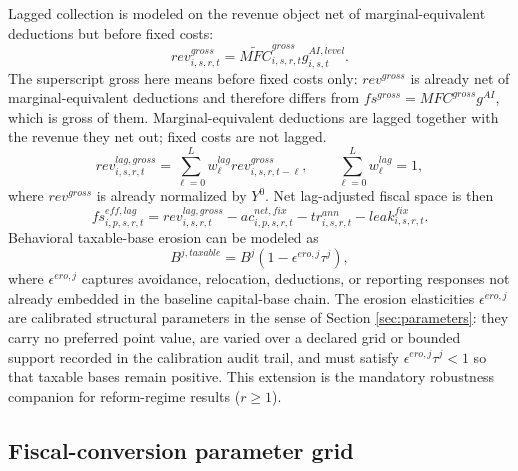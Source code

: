 \documentclass[11pt,a4paper]{article}
\begin{document}
Lagged collection is modeled on the revenue object net of marginal-equivalent deductions but before fixed costs:
\begin{equation}
    rev^{gross}_{i,s,r,t}=\widetilde{MFC}^{gross}_{i,s,r,t}g^{AI,level}_{i,s,t}.
\end{equation}
The superscript gross here means before fixed costs only: $rev^{gross}$ is already net of marginal-equivalent deductions and therefore differs from $fs^{gross}=MFC^{gross}g^{AI}$, which is gross of them. Marginal-equivalent deductions are lagged together with the revenue they net out; fixed costs are not lagged.
\begin{equation}
    rev^{lag,gross}_{i,s,r,t}=\sum_{\ell=0}^{L}w^{lag}_\ell rev^{gross}_{i,s,r,t-\ell},
    \qquad \sum_{\ell=0}^{L}w^{lag}_\ell=1,
\end{equation}
where $rev^{gross}$ is already normalized by $Y^0$. Net lag-adjusted fiscal space is then
\begin{equation}
    fs^{eff,lag}_{i,p,s,r,t}=rev^{lag,gross}_{i,s,r,t}-ac^{net,fix}_{i,p,s,r,t}-tr^{ann}_{i,s,r,t}-leak^{fix}_{i,s,r,t}.
\end{equation}
Behavioral taxable-base erosion can be modeled as
\begin{equation}
    B^{j,taxable}=B^j(1-\epsilon^{ero,j}\tau^j),
\end{equation}
where $\epsilon^{ero,j}$ captures avoidance, relocation, deductions, or reporting responses not already embedded in the baseline capital-base chain. The erosion elasticities $\epsilon^{ero,j}$ are calibrated structural parameters in the sense of Section \ref{sec:parameters}: they carry no preferred point value, are varied over a declared grid or bounded support recorded in the calibration audit trail, and must satisfy $\epsilon^{ero,j}\tau^j<1$ so that taxable bases remain positive.
This extension is the mandatory robustness companion for reform-regime results ($r\geq1$).

\subsection{Fiscal-conversion parameter grid}
\end{document}
